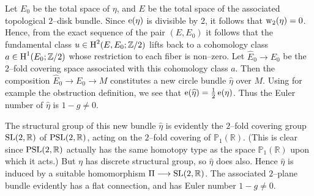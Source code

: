 \documentclass[../main]{subfiles}
\begin{document}
Let $E_0$ be the total space of $\eta$, and $E$ be the total space of the associated topological $2$--disk bundle. Since $\operatorname{e}(\eta)$ is divisible by $2$, it follows that $\operatorname{w}_2(\eta) = 0$. Hence, from the exact sequence of the pair $(E, E_0)$ it follows that the fundamental class $u \in \operatorname{H}^2(E, E_0; {\mathbb Z}/2)$ lifts back to a cohomology class $a \in \operatorname{H}^1(E_0; {\mathbb Z}/2)$ whose restriction to each fiber is non--zero. Let ${\widehat E}_0 \longrightarrow E_0$ be the $2$--fold covering space associated with this cohomology class $a$. Then the composition ${\widehat E}_0 \longrightarrow E_0 \longrightarrow M$ constitutes a new circle bundle ${\widehat \eta}$ over $M$. Using for example the obstruction definition, we see that $\operatorname{e}({\widehat \eta}) = \tfrac 1 2 \operatorname{e}(\eta)$. Thus the Euler number of ${\widehat \eta}$ is $1 - g \ne 0$. 

The structural group of this new bundle ${\widehat \eta}$ is evidently the $2$--fold covering group $\operatorname{SL}(2, \mathbb R)$ of $\operatorname{PSL}(2, \mathbb R)$, acting on the $2$--fold covering of ${\mathbb P}_1(\mathbb R)$. (This is clear since $\operatorname{PSL}(2, \mathbb R)$ actually has the same homotopy type as the space ${\mathbb P}_1(\mathbb R)$ upon which it acts.) But $\eta$ has discrete structural group, so ${\widehat \eta}$ does also. Hence ${\widehat \eta}$ is induced by a suitable homomorphism $\Pi \longrightarrow \operatorname{SL}(2, \mathbb R)$. The associated $2$--plane bundle evidently has a flat connection, and has Euler number $1 - g \ne 0$.
\end{document}
